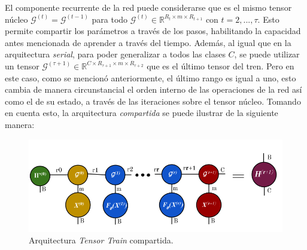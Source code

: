 \documentclass[spanish]{article}
\theoremstyle{definition}
\theoremstyle{remark}
\numberwithin{equation}{section}
\numberwithin{equation}{section} %
\begin{document}
\par
El componente recurrente de la red puede considerarse que es el mismo tensor núcleo $\mathcal{G}^{(t)}=\mathcal{G}^{(t-1)}$ para todo $\mathcal{G}^{(t)} \in \mathbb{R}^{R_t \times m \times R_{t+1}}$ con $t=2,...,\tau$. Esto permite compartir los parámetros a través de los pasos, habilitando la capacidad antes mencionada de aprender a través del tiempo. Además, al igual que en la arquitectura \textit{serial}, para poder generalizar a todos las clases $C$, se puede utilizar un tensor  $\mathcal{G}^{(\tau+1)} \in \mathbb{R}^{C \times R_{\tau+1} \times m \times R_{\tau+2}}$ que es el último tensor del tren. Pero en este caso, como se mencionó anteriormente, el último rango es igual a uno, esto cambia de manera circunstancial el orden interno de las operaciones de la red así como el de su estado, a través de las iteraciones sobre el tensor núcleo. Tomando en cuenta esto, la arquitectura \textit{compartida} se puede ilustrar de la siguiente manera:
\begin{figure}[H]
 \centering
 \includegraphics[width=13cm]{img/ejemplo_arquitectura_compartida_tensor_train.png}
\caption[Arquitectura \textit{Tensor Train} compartida]{\footnotesize{Arquitectura \textit{Tensor Train} compartida.}}
\label{fig:arquitecture_shared_tensor_train}
\end{figure}\par
\end{document}
